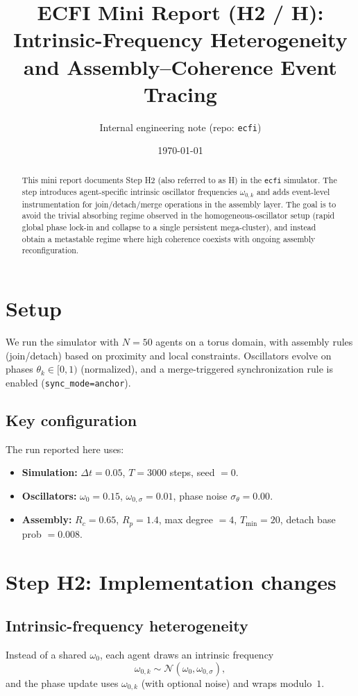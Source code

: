 \documentclass[11pt]{article}
\title{ECFI Mini Report (H2 / H\textquotesingle): Intrinsic-Frequency Heterogeneity and Assembly--Coherence Event Tracing}
\author{Internal engineering note (repo: \texttt{ecfi})}
\date{\today}
\begin{document}
\maketitle

\begin{abstract}
This mini report documents Step H2 (also referred to as H\textquotesingle) in the \texttt{ecfi} simulator. The step introduces agent-specific intrinsic oscillator frequencies $\omega_{0,k}$ and adds event-level instrumentation for join/detach/merge operations in the assembly layer. The goal is to avoid the trivial absorbing regime observed in the homogeneous-oscillator setup (rapid global phase lock-in and collapse to a single persistent mega-cluster), and instead obtain a metastable regime where high coherence coexists with ongoing assembly reconfiguration.
\end{abstract}

\section{Setup}
We run the simulator with $N=50$ agents on a torus domain, with assembly rules (join/detach) based on proximity and local constraints. Oscillators evolve on phases $\theta_k \in [0,1)$ (normalized), and a merge-triggered synchronization rule is enabled (\texttt{sync\_mode=anchor}).

\subsection{Key configuration}
The run reported here uses:
\begin{itemize}
\item \textbf{Simulation:} $\Delta t=0.05$, $T=3000$ steps, seed $=0$.
\item \textbf{Oscillators:} $\omega_0 = 0.15$, \textbf{$\omega_{0,\sigma}=0.01$}, phase noise $\sigma_{\theta}=0.00$.
\item \textbf{Assembly:} $R_c=0.65$, $R_p=1.4$, max degree $=4$, $T_{\min}=20$, detach base prob $=0.008$.
\end{itemize}

\section{Step H2: Implementation changes}
\subsection{Intrinsic-frequency heterogeneity}
Instead of a shared $\omega_0$, each agent draws an intrinsic frequency
\[
\omega_{0,k} \sim \mathcal{N}(\omega_0,\omega_{0,\sigma}),
\]
and the phase update uses $\omega_{0,k}$ (with optional noise) and wraps modulo~$1$.
\end{document}
